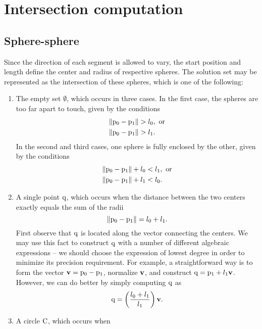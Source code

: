 \documentclass[oneside]{memoir}
\begin{document}
\chapter{Intersection computation}

\section{Sphere-sphere} 


Since the direction of each segment is allowed to vary, the start position and
length define the center and radius of respective spheres. The solution set may
be represented as the intersection of these spheres, which is one of the
following:
\begin{enumerate}
  \item The empty set $\emptyset$, which occurs in three cases. In the first
  case, the spheres are too far apart to touch, given by the conditions
  \begin{align} 
  \|\mathrm{p_0}-\mathrm{p_1}\| &> l_0,\text{ or} \\
  \|\mathrm{p_0}-\mathrm{p_1}\| &> l_1. 
  \end{align}
  In the second and third cases, one sphere is fully enclosed by the other,
  given by the conditions 
  \begin{align}
  \|\mathrm{p_0}-\mathrm{p_1}\| + l_0 &< l_1,\text{ or} \\
  \|\mathrm{p_0}-\mathrm{p_1}\| + l_1 &< l_0.
  \end{align}
  \item A single point $\mathrm{q}$, which occurs when the distance between the two
  centers exactly equals the sum of the radii
  \begin{equation}
  \|\mathrm{p_0}-\mathrm{p_1}\|=l_0+l_1. 
  \end{equation}
  First observe that $\mathrm{q}$ is located along the vector connecting the
  centers. We may use this fact to construct $\mathrm{q}$ with a number of
  different algebraic expressions -- we should choose the expression of
  lowest degree in order to minimize its precision requirement. For example, a
  straightforward way is to form the vector $\mathbf{v} = \mathrm{p_0}-\mathrm{p_1}$,
  normalize $\mathbf{v}$, and construct $\mathrm{q} = \mathrm{p_1}+l_1\mathbf{v}$. However,
  we can do better by simply computing $\mathrm{q}$ as
  \begin{equation}
  \mathrm{q} = \left(\frac{l_0+l_1}{l_1}\right)\mathbf{v}.
  \end{equation}
  \item A circle $\mathrm{C}$, which occurs when

\end{enumerate}
\end{document}
